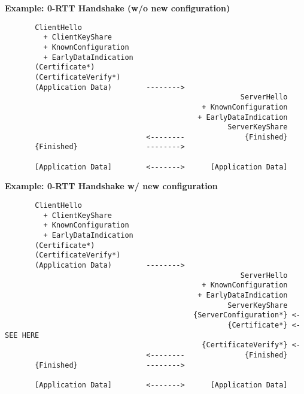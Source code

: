 \documentclass[helvetica]{seminar}
\newcommand{\heading}[1]{%
  \begin{center} 
    \large\bf 
    #1 
  \end{center} 
  \vspace{.4 in}}
\begin{document}
\begin{slide}
\heading{Example: 0-RTT Handshake (w/o new configuration)}

\vspace{-4ex}
\begin{footnotesize}
\begin{verbatim}
       ClientHello
         + ClientKeyShare
         + KnownConfiguration
         + EarlyDataIndication
       (Certificate*)
       (CertificateVerify*)
       (Application Data)        -------->
                                                       ServerHello
                                              + KnownConfiguration
                                             + EarlyDataIndication
                                                    ServerKeyShare
                                 <--------              {Finished}
       {Finished}                -------->

       [Application Data]        <------->      [Application Data]
\end{verbatim}
\end{footnotesize}
\end{slide}


\begin{slide}
\heading{Example: 0-RTT Handshake w/ new configuration}

\vspace{-4ex}
\begin{footnotesize}
\begin{verbatim}
       ClientHello
         + ClientKeyShare
         + KnownConfiguration
         + EarlyDataIndication
       (Certificate*)
       (CertificateVerify*)
       (Application Data)        -------->
                                                       ServerHello
                                              + KnownConfiguration
                                             + EarlyDataIndication
                                                    ServerKeyShare
                                            {ServerConfiguration*} <- 
                                                    {Certificate*} <- SEE HERE
                                              {CertificateVerify*} <-
                                 <--------              {Finished}
       {Finished}                -------->

       [Application Data]        <------->      [Application Data]
\end{verbatim}
\end{footnotesize}
\end{slide}
\end{document}
